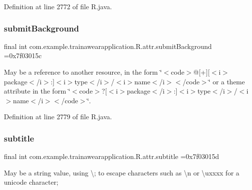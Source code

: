 Definition at line 2772 of file R.\+java.

\mbox{\label{classcom_1_1example_1_1trainawearapplication_1_1_r_1_1attr_ae845d7e93eec450d109ae369c4fd2baf}} 
\subsubsection{\texorpdfstring{submitBackground}{submitBackground}}
{\footnotesize\ttfamily final int com.\+example.\+trainawearapplication.\+R.\+attr.\+submit\+Background =0x7f03015c\hspace{0.3cm}{\ttfamily [static]}}

May be a reference to another resource, in the form \char`\"{}$<$code$>$@\mbox{[}+\mbox{]}\mbox{[}$<$i$>$package$<$/i$>$\+:\mbox{]}$<$i$>$type$<$/i$>$/$<$i$>$name$<$/i$>$$<$/code$>$\char`\"{} or a theme attribute in the form \char`\"{}$<$code$>$?\mbox{[}$<$i$>$package$<$/i$>$\+:\mbox{]}$<$i$>$type$<$/i$>$/$<$i$>$name$<$/i$>$$<$/code$>$\char`\"{}. 

Definition at line 2779 of file R.\+java.

\mbox{\label{classcom_1_1example_1_1trainawearapplication_1_1_r_1_1attr_ae1ec416fcf580345415341ce8164f280}} 
\subsubsection{\texorpdfstring{subtitle}{subtitle}}
{\footnotesize\ttfamily final int com.\+example.\+trainawearapplication.\+R.\+attr.\+subtitle =0x7f03015d\hspace{0.3cm}{\ttfamily [static]}}

May be a string value, using \textquotesingle{}\textbackslash{};\textquotesingle{} to escape characters such as \textquotesingle{}\textbackslash{}n\textquotesingle{} or \textquotesingle{}\textbackslash{}uxxxx\textquotesingle{} for a unicode character; 

